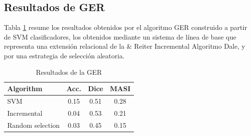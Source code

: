 \subsection{Resultados de GER }

Tabla \ref{tab-reg-results} resume los resultados obtenidos por el algoritmo GER construido a partir de SVM clasificadores, los obtenidos mediante un sistema de l\'{i}nea de base que representa una extensi\'on relacional de la \& Reiter Incremental Algoritmo Dale, y por una estrategia de selecci\'on aleatoria.

\begin{table}[H]
\begin{center}
\caption{Resultados de la GER}
\label{tab-reg-results}
\begin{tabular} {  l c c c }
\hline
{Algorithm}							& {Acc.} 	& { Dice}		& MASI \\ \hline 
SVM											& 0.15		& 0.51			& 0.28 \\
Incremental							& 0.04		& 0.53			& 0.21 \\
Random selection       	& 0.03    & 0.45      & 0.15 \\
\hline
\end{tabular}
\end{center}
\end{table}





